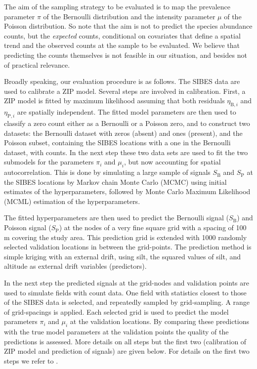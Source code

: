 \documentclass[review]{elsarticle}
\begin{document}
The aim of the sampling strategy to be evaluated is to map the prevalence parameter $\pi$ of the Bernoulli distribution and the intensity parameter $\mu$ of the Poisson distribution. So note that the aim is not to predict the species abundance counts, but the \emph{expected} counts, conditional on covariates that define a spatial trend and the observed counts at the sample to be evaluated. We believe that predicting the counts themselves is not feasible in our situation, and besides not of practical relevance.

Broadly speaking, our evaluation procedure is as follows. The SIBES data are used to calibrate a ZIP model. Several steps are involved in calibration. First, a ZIP model is fitted by maximum likelihood assuming that both residuals $\eta_{\mathrm{B},i}$ and $\eta_{\mathrm{P},i}$ are spatially independent. The fitted model parameters are then used to classify a zero count either as a Bernoulli or a Poisson zero, and to construct two datasets: the Bernoulli dataset with zeros (absent) and ones (present), and the Poisson subset, containing the SIBES locations with a one in the Bernoulli dataset, with counts. In the next step these two data sets are used to fit the two submodels for the parameters $\pi_i$ and $\mu_i$, but now accounting for spatial autocorrelation. This is done by simulating a large sample of signals $S_{\mathrm{B}}$ and $S_{\mathrm{P}}$ at the SIBES locations by Markov chain Monte Carlo (MCMC) using initial estimates of the hyperparameters, followed by Monte Carlo Maximum Likelihood (MCML) estimation of the hyperparameters.

The fitted hyperparameters are then used to predict the Bernoulli signal ($S_{\mathrm{B}}$) and Poisson signal ($S_{\mathrm{P}}$) at the nodes of a very fine square grid with a spacing of 100 m covering the study area. This prediction grid is extended with 1000 randomly selected validation locations in between the grid-points. The prediction method is simple kriging with an external drift, using silt, the squared values of silt, and altitude as external drift variables (predictors).

In the next step the predicted signals at the grid-nodes and validation points are used to simulate fields with count data. One field with statistics closest to those of the SIBES data is selected, and repeatedly sampled by grid-sampling. A range of grid-spacings is applied. Each selected grid is used to predict the model parameters $\pi_i$ and $\mu_i$ at the validation locations. By comparing these predictions with the true model parameters at the validation points the quality of the predictions is assessed. More details on all steps but the first two (calibration of ZIP model and prediction of signals) are given below. For details on the first two steps we refer to \citet{lyashevska2015a}.
\end{document}
